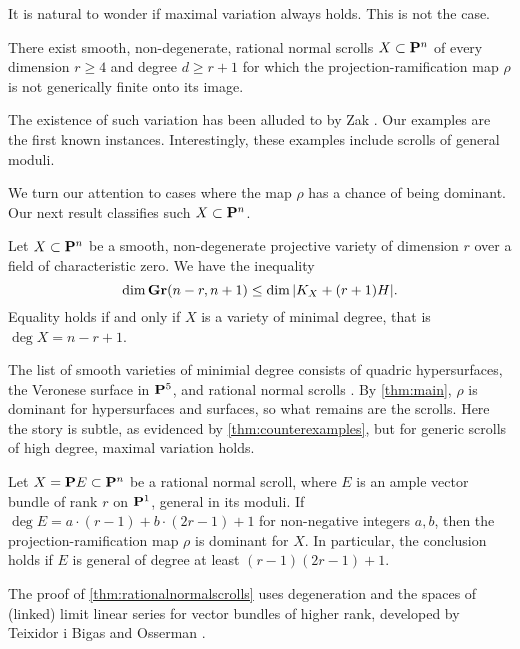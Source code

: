 \documentclass[11pt,reqno]{amsart}
\theoremstyle{plain}
\theoremstyle{definition}
\theoremstyle{remark}
\numberwithin{equation}{section}
\numberwithin{equation}{section}
\begin{document}
It is natural to wonder if maximal variation always holds.
This is not the case.
\begin{maintheorem}
  \label{thm:counterexamples}
  There exist smooth, non-degenerate, rational normal scrolls $X \subset \P^{n}$ of every dimension $r \geq 4$ and degree $d \geq r+1$ for which the projection-ramification map $\rho$ is not generically finite onto its image.
\end{maintheorem}

The existence of such variation has been alluded to by Zak \cite{zak:}.
Our examples are the first known instances.
Interestingly, these examples include scrolls of general moduli.

We turn our attention to cases where the map $\rho$ has a chance of being dominant.
Our next result classifies such $X \subset \P^n$.
\begin{maintheorem}
  \label{thm:minimaldegree}
  Let $X \subset \P^{n}$ be a smooth, non-degenerate projective variety of dimension $r$ over a field of characteristic zero.
  We have the inequality
  \[ \dim \Gr(n-r, n+1) \leq \dim |K_X + (r+1)H|.\]
  Equality holds if and only if $X$ is a variety of minimal degree, that is $\deg X = n-r+1$.
\end{maintheorem}

The list of smooth varieties of minimial degree consists of quadric hypersurfaces, the Veronese surface in $\P^5$, and rational normal scrolls \cite[Theorem~19.9]{har:95}.
By \autoref{thm:main}, $\rho$ is dominant for hypersurfaces and surfaces, so what remains are the scrolls.
Here the story is subtle, as evidenced by \autoref{thm:counterexamples}, but for generic scrolls of high degree, maximal variation holds.
\begin{maintheorem}
  \label{thm:rationalnormalscrolls}
  Let $X = \P E \subset \P^n$ be a rational normal scroll, where $E$ is an ample vector bundle of rank $r$ on $\P^1$, general in its moduli.
  If $\deg E = a \cdot (r-1) + b \cdot (2r-1) + 1$ for non-negative integers $a, b$, then the projection-ramification map $\rho$ is dominant for $X$.
  In particular, the conclusion holds if $E$ is general of degree at least $(r-1)(2r-1) + 1$.
\end{maintheorem}
The proof of \autoref{thm:rationalnormalscrolls} uses degeneration and the spaces of (linked) limit linear series for vector bundles of higher rank, developed by Teixidor i Bigas \cite{tei-i-big:91} and Osserman \cite{oss:14}.
\end{document}
